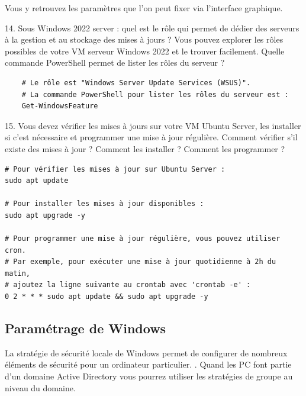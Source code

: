 \noindent Vous y retrouvez les paramètres que l’on peut fixer via l’interface graphique.

\vspace{0.5cm}

14. Sous Windows 2022 server : quel est le rôle qui permet de dédier des serveurs à la gestion et au stockage des mises à jours ? Vous pouvez explorer les rôles possibles de votre VM serveur Windows 2022 et le trouver facilement. Quelle commande PowerShell permet de lister les rôles du serveur ?

\begin{center}
  \begin{verbatim}
    # Le rôle est "Windows Server Update Services (WSUS)".
    # La commande PowerShell pour lister les rôles du serveur est :
    Get-WindowsFeature
  \end{verbatim}
\end{center}

\vspace{0.5cm}

15. Vous devez vérifier les mises à jours sur votre VM Ubuntu Server, les installer si c’est nécessaire et
programmer une mise à jour régulière.
Comment vérifier s’il existe des mises à jour ? Comment les installer ? Comment les programmer ?

\begin{verbatim}
# Pour vérifier les mises à jour sur Ubuntu Server :
sudo apt update

# Pour installer les mises à jour disponibles :
sudo apt upgrade -y

# Pour programmer une mise à jour régulière, vous pouvez utiliser cron.
# Par exemple, pour exécuter une mise à jour quotidienne à 2h du matin,
# ajoutez la ligne suivante au crontab avec 'crontab -e' :
0 2 * * * sudo apt update && sudo apt upgrade -y
\end{verbatim}

\subsection*{Paramétrage de Windows}
{}
\noindent La stratégie de sécurité locale de Windows permet de configurer de nombreux éléments de sécurité pour un ordinateur particulier. . Quand les PC font partie d'un domaine Active Directory vous pourrez utiliser les stratégies de groupe au niveau du domaine.

\vspace{0.5cm}

